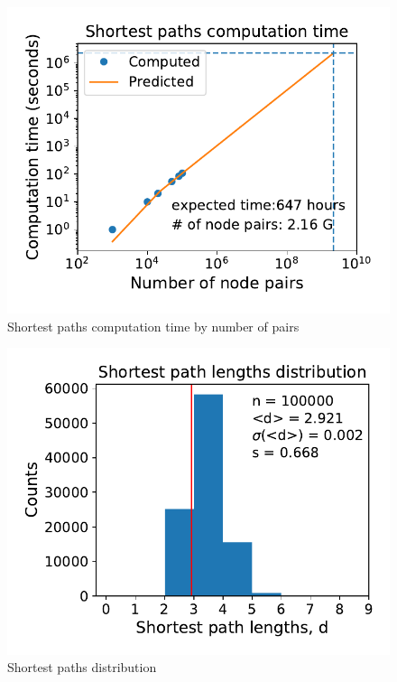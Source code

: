 \documentclass[11pt, twoside]{report}
\begin{document}
    
\begin{minipage}[b]{0.5\textwidth}
   \centering
    \begin{figure}[H]
      \includegraphics[width=\textwidth]{../../scripts/network_analysis/imgs/paths_computation_time.pdf}            
          \caption{Shortest paths computation time by number of pairs}
      \label{fig:path_time}
\end{figure}
\end{minipage}
\begin{minipage}[b]{0.5\textwidth}
  \begin{figure}[H]
  \centering
      \includegraphics[width=\textwidth]{../../scripts/network_analysis/imgs/paths_hist.pdf}            
        \caption{Shortest paths distribution}
\end{figure}
\end{minipage}
\end{document}
